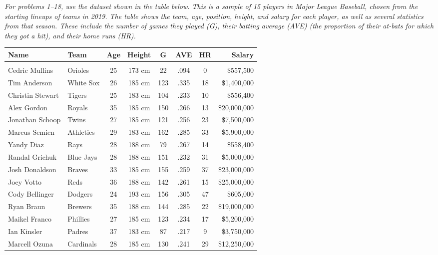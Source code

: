 \emph{For problems 1--18, use the dataset shown in the table below.  This is a sample of 15 players in Major League Baseball, chosen from the starting lineups of teams in 2019.  The table shows the team, age, position, height, and salary for each player, as well as several statistics from that season.  These include the number of games they played (G), their batting average (AVE) (the proportion of their at-bats for which they got a hit), and their home runs (HR).}
\begin{center}
{\footnotesize
\begin{tabular}{l l c c c c c r}
\textbf{Name} & \textbf{Team} & \textbf{Age} & \textbf{Height} & \textbf{G} & \textbf{AVE} & \textbf{HR} & \textbf{Salary}\\
\hline
& & & & & & & \\
Cedric Mullins & Orioles & 25 & 173 cm & 22 & .094 & 0 & \$557,500\\
Tim Anderson & White Sox & 26 & 185 cm & 123 & .335 & 18 & \$1,400,000\\
Christin Stewart & Tigers & 25 & 183 cm & 104 & .233 & 10 & \$556,400\\
Alex Gordon & Royals & 35 & 185 cm & 150 & .266 & 13 & \$20,000,000\\
Jonathan Schoop & Twins & 27 & 185 cm & 121 & .256 & 23 & \$7,500,000\\
Marcus Semien & Athletics & 29 & 183 cm & 162 & .285 & 33 & \$5,900,000\\
Yandy Diaz & Rays & 28 & 188 cm & 79 & .267 & 14 & \$558,400\\
Randal Grichuk & Blue Jays & 28 & 188 cm & 151 & .232 & 31 & \$5,000,000\\
Josh Donaldson & Braves & 33 & 185 cm & 155 & .259 & 37 & \$23,000,000\\
Joey Votto & Reds & 36 & 188 cm & 142 & .261 & 15 & \$25,000,000\\
Cody Bellinger & Dodgers & 24 & 193 cm & 156 & .305 & 47 & \$605,000\\
Ryan Braun & Brewers & 35 & 188 cm & 144 & .285 & 22 & \$19,000,000\\
Maikel Franco & Phillies & 27 & 185 cm & 123 & .234 & 17 & \$5,200,000\\
Ian Kinsler & Padres & 37 & 183 cm & 87 & .217 & 9 & \$3,750,000\\
Marcell Ozuna & Cardinals & 28 & 185 cm & 130 & .241 & 29 & \$12,250,000\\
\end{tabular}}
\end{center}

